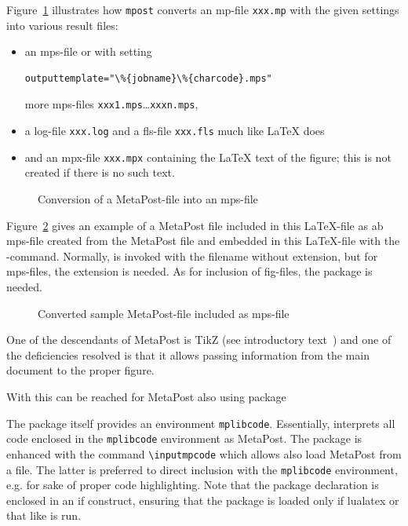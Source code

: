 Figure~\ref{fig:mp2mps} illustrates 
how \texttt{mpost} converts an \gls{mp}-file \texttt{xxx.mp} 
with the given settings into various result files: 
%
\begin{itemize}
\item
an \gls{mps}-file or with setting 
\begin{verbatim}outputtemplate="\%{jobname}\%{charcode}.mps"\end{verbatim}
more \gls{mps}-files \texttt{xxx1.mps}\dots \texttt{xxxn.mps}, 
\item
a log-file \texttt{xxx.log} and a fls-file \texttt{xxx.fls} much like \LaTeX{} does 
\item
and an \gls{mpx}-file \texttt{xxx.mpx} containing the \LaTeX{} text of the figure; 
this is not created if there is no such text. 
\end{itemize}



\begin{figure}[htb]
\centering
{}
\caption{\label{fig:mp2mps}Conversion of a MetaPost-file into an mps-file}
\end{figure}


Figure~\ref{fig:metapost} gives an example of a MetaPost file 
included in this \LaTeX-file as ab mps-file 
created from the MetaPost file 
and embedded in this \LaTeX-file 
with the -command. 
Normally,  is invoked with the filename without extension, 
but for mps-files, the extension is needed. 
As for inclusion of fig-files, the package  is needed. 

\begin{figure}[htb]
\centering
{}
\caption{\label{fig:metapost}
Converted sample MetaPost-file included as mps-file  }
\end{figure}

One of the descendants of MetaPost is TikZ (see introductory text~\cite{TikzIntro})
and one of the deficiencies resolved is that it allows passing information 
from the main document to the proper figure. 

With \lualatex{} this can be reached for MetaPost also using package  
%


The package itself provides an environment \texttt{mplibcode}. 
Essentially, \lualatex{} interprets all code 
enclosed in the \texttt{mplibcode} environment as MetaPost. 
The package is enhanced with the command \texttt{\textbackslash inputmpcode} 
which allows also load MetaPost from a file. 
The latter is preferred to direct inclusion with the \texttt{mplibcode} environment, 
e.g. for sake of proper code highlighting. 
Note that the package declaration is enclosed in an if construct, 
ensuring that the package is loaded only if lualatex or that like is run. 

